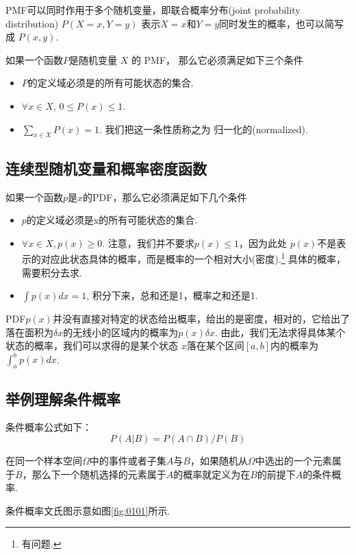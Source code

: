 PMF可以同时作用于多个随机变量，即联合概率分布(joint probability distribution) \(P(X=x,Y=y)\) 表示\(X=x\)和\(Y=y\)同时发生的概率，也可以简写成 \(P(x,y)\).

如果一个函数\(P​\)是随机变量 \(X​\) 的 PMF， 那么它必须满足如下三个条件
\begin{itemize}
\item  \(P​\)的定义域必须是的所有可能状态的集合.
\item  \(∀x∈​X\), \(0 \leqslant P(x) \leqslant 1 ​\).
\item  \(∑_{x∈X} P(x)=1\). 我们把这一条性质称之为 归一化的(normalized).
\end{itemize}

\subsection{连续型随机变量和概率密度函数}
\label{ux8fdeux7eedux578bux968fux673aux53d8ux91cfux548cux6982ux7387ux5bc6ux5ea6ux51fdux6570}
\begin{defination}
如果一个函数\(p​\)是$x$的PDF，那么它必须满足如下几个条件
\begin{itemize}
 \item  \(p\)的定义域必须是x的所有可能状态的集合.
 \item  \(∀x∈X,p(x)≥0\).
   注意，我们并不要求$ p(x)≤1$，因为此处  \(p(x)\)不是表示的对应此状态具体的概率，而是概率的一个相对大小(密度).\footnote{有问题.}
   具体的概率，需要积分去求.
\item  \(∫p(x)dx=1\), 积分下来，总和还是1，概率之和还是1.
\end{itemize}  
\end{defination}

\begin{remark}
  PDF\(p(x)\)并没有直接对特定的状态给出概率，给出的是密度，相对的，它给出了落在面积为\(δx\)的无线小的区域内的概率为$ p(x)δx$.
由此，我们无法求得具体某个状态的概率，我们可以求得的是某个状态 \(x\)落在某个区间\([a,b]\)内的概率为$ \int_{a}^{b}p(x)dx$.
\end{remark}

\subsection{举例理解条件概率}
\label{ux4e3eux4f8bux7406ux89e3ux6761ux4ef6ux6982ux7387}
\begin{theorem}
条件概率公式如下：
\[
P(A|B) = P(A\cap B) / P(B)
\]  
\end{theorem}
\begin{remark}
  在同一个样本空间\(\Omega\)中的事件或者子集\(A\)与\(B\)，如果随机从\(\Omega\)中选出的一个元素属于\(B\)，那么下一个随机选择的元素属于\(A\)的概率就定义为在\(B\)的前提下\(A\)的条件概率.
\end{remark}
条件概率文氏图示意如图\ref{fig:0101}所示.

